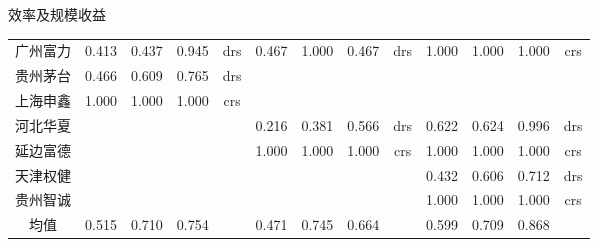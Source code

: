 \documentclass[]{beamer}
\begin{document}
\begin{frame}{效率及规模收益}
{\begin{tabular}{ccccccccccccc}
            广州富力 & 0.413 & 0.437 & 0.945 & drs & 0.467 & 1.000 & 0.467 & drs & 1.000 & 1.000 & 1.000 & crs \\
            贵州茅台 & 0.466 & 0.609 & 0.765 & drs & & & & & & & & \\
            上海申鑫 & 1.000 & 1.000 & 1.000 & crs & & & & & & & & \\
            河北华夏 & & & & & 0.216 & 0.381 & 0.566 & drs & 0.622 & 0.624 & 0.996 & drs \\
            延边富德 & & & & & 1.000 & 1.000 & 1.000 & crs & 1.000 & 1.000 & 1.000 & crs \\
            天津权健 & & & & & & & & & 0.432 & 0.606 & 0.712 & drs \\
            贵州智诚 & & & & & & & & & 1.000 & 1.000 & 1.000 & crs \\
            均值 & 0.515 & 0.710 & 0.754 & & 0.471 & 0.745 & 0.664 & & 0.599 & 0.709 & 0.868 & \\
            \bottomrule
        \end{tabular}
    }
\end{frame}
\end{document}
